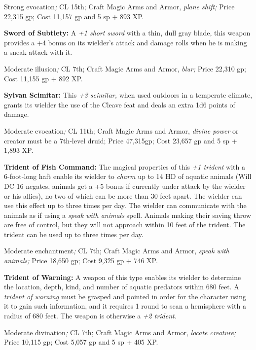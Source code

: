 \documentclass{article}
\begin{document}
Strong evocation\textit{; }CL 15th; Craft Magic Arms and Armor, \textit{plane shift; 
}Price 22,315 gp; Cost 11,157 gp and 5 sp + 893 XP.

\textbf{Sword of Subtlety:} A \textit{+1 short sword }with a thin, dull gray blade, 
this weapon provides a +4 bonus on its wielder's attack and damage rolls when he 
is making a sneak attack with it.

Moderate illusion\textit{; }CL 7th; Craft Magic Arms and Armor, \textit{blur; }Price 
22,310 gp; Cost 11,155 gp + 892 XP.

\textbf{Sylvan Scimitar:} This \textit{+3 scimitar, }when used outdoors in a temperate 
climate, grants its wielder the use of the Cleave feat and deals an extra 1d6 points 
of damage.

Moderate evocation\textit{; }CL 11th; Craft Magic Arms and Armor, \textit{divine 
power }or creator must be a 7th-level druid; Price 47,315gp; Cost 23,657 gp and 
5 sp + 1,893 XP.

\textbf{Trident of Fish Command:} The magical properties of this \textit{+1 trident 
}with a 6-foot-long haft enable its wielder to \textit{charm }up to 14 HD of aquatic 
animals (Will DC 16 negates, animals get a +5 bonus if currently under attack by 
the wielder or his allies), no two of which can be more than 30 feet apart. The 
wielder can use this effect up to three times per day. The wielder can communicate 
with the animals as if using a \textit{speak with animals }spell. Animals making 
their saving throw are free of control, but they will not approach within 10 feet 
of the trident. The trident can be used up to three times per day.

Moderate enchantment\textit{; }CL 7th; Craft Magic Arms and Armor, \textit{speak 
with animals; }Price 18,650 gp; Cost 9,325 gp + 746 XP.

\textbf{Trident of Warning:} A weapon of this type enables its wielder to determine 
the location, depth, kind, and number of aquatic predators within 680 feet. A \textit{trident 
of warning }must be grasped and pointed in order for the character using it to 
gain such information, and it requires 1 round to scan a hemisphere with a radius 
of 680 feet. The weapon is otherwise a \textit{+2 trident.}

Moderate divination\textit{; }CL 7th; Craft Magic Arms and Armor, \textit{locate 
creature; }Price 10,115 gp; Cost 5,057 gp and 5 sp + 405 XP.

\newpage
\end{document}
